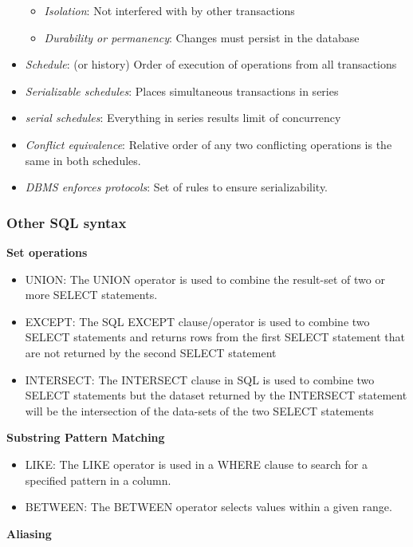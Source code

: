\documentclass{article}
\begin{document}
\begin{itemize}
\begin{itemize}
        \item \textit{Isolation}: Not interfered with by other transactions
        \item \textit{Durability or permanency}: Changes must persist in the database
    \end{itemize}
    \item \textit{Schedule}: (or history) Order of execution of operations from all transactions
    \item \textit{Serializable schedules}: Places simultaneous transactions in series
    \item \textit{serial schedules}: Everything in series results limit of concurrency
    \item \textit{Conflict equivalence}: Relative order of any two conflicting operations is the same in both schedules.
    \item \textit{DBMS enforces protocols}: Set of rules to ensure serializability.
\end{itemize}

\subsubsection{Other SQL syntax}
\textbf{Set operations}
\begin{itemize}
    \item UNION: The UNION operator is used to combine the result-set of two or more SELECT statements.
    \item EXCEPT: The SQL EXCEPT clause/operator is used to combine two SELECT statements and returns rows from the first SELECT statement that are not returned by the second SELECT statement
    \item INTERSECT: The INTERSECT clause in SQL is used to combine two SELECT statements but the dataset returned by the INTERSECT statement will be the intersection of the data-sets of the two SELECT statements
\end{itemize}

\textbf{Substring Pattern Matching}
\begin{itemize}
    \item LIKE: The LIKE operator is used in a WHERE clause to search for a specified pattern in a column.
    \item BETWEEN: The BETWEEN operator selects values within a given range.
\end{itemize}

\textbf{Aliasing}

\end{document}
